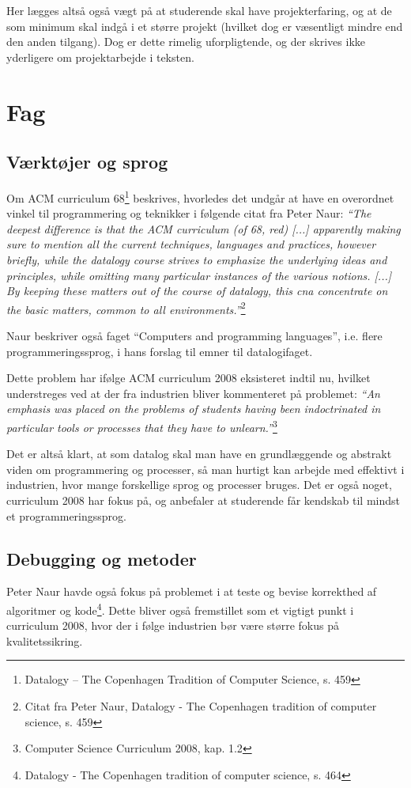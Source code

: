 \documentclass[10pt,a4paper]{article}
\newcommand{\citat}[2]{\vspace{0.1cm}\newline\textit{``#1''}\hspace{0.1cm}\footnote{#2}\vspace{0.1cm}\newline}
\begin{document}
Her lægges altså også vægt på at studerende skal have projekterfaring, og at de
som minimum skal indgå i et større projekt (hvilket dog er væsentligt mindre end
den anden tilgang). Dog er dette rimelig uforpligtende, og der skrives ikke
yderligere om projektarbejde i teksten.

\section{Fag}
\subsection{Værktøjer og sprog}
Om ACM curriculum 68\footnote{Datalogy -- The Copenhagen Tradition of Computer
    Science, s. 459} beskrives, hvorledes det undgår at have en overordnet
vinkel til programmering og teknikker i følgende citat fra Peter Naur:
\citat{The deepest difference is that the ACM curriculum (of 68, red) [...]
    apparently making sure to mention all the current techniques, languages and
    practices, however briefly, while the datalogy course strives to emphasize
    the underlying ideas and principles, while omitting many particular
    instances of the various notions. [...] By keeping these matters out of the
    course of datalogy, this cna concentrate on the basic matters, common to all
    environments.}{Citat fra Peter Naur, Datalogy - The Copenhagen tradition of
    computer science, s. 459}

Naur beskriver også faget ``Computers and programming languages'', i.e. flere
programmeringssprog, i hans forslag til emner til datalogifaget. 

Dette problem har ifølge ACM curriculum 2008 eksisteret indtil nu, hvilket
understreges ved at der fra industrien bliver kommenteret på problemet:
\citat{An emphasis was placed on the problems of students having been
    indoctrinated in particular tools or processes that they have to
    unlearn.}{Computer Science Curriculum 2008, kap. 1.2}

Det er altså klart, at som datalog skal man have en grundlæggende og abstrakt
viden om programmering og processer, så man hurtigt kan arbejde med effektivt i
industrien, hvor mange forskellige sprog og processer bruges. Det er også noget,
curriculum 2008 har fokus på, og anbefaler at studerende får kendskab til mindst
et programmeringssprog.

\subsection{Debugging og metoder}
Peter Naur havde også fokus på problemet i at teste og bevise korrekthed af
algoritmer og kode\footnote{Datalogy - The Copenhagen tradition
    of computer science, s. 464}. Dette bliver også fremstillet som et vigtigt punkt i
curriculum 2008, hvor der i følge industrien bør være større fokus på
kvalitetssikring. 
\end{document}
